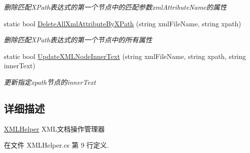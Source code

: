 \begin{DoxyCompactItemize}
\begin{DoxyCompactList}\small\item\em 删除匹配\-X\-Path表达式的第一个节点中的匹配参数xml\-Attribute\-Name的属性 \end{DoxyCompactList}\item 
static bool \hyperlink{class_x_c_l_net_tools_1_1_x_m_l_1_1_x_m_l_helper_a07059a8c89a84c359cc9893c842a263e}{Delete\-All\-Xml\-Attribute\-By\-X\-Path} (string xml\-File\-Name, string xpath)
\begin{DoxyCompactList}\small\item\em 删除匹配\-X\-Path表达式的第一个节点中的所有属性 \end{DoxyCompactList}\item 
static bool \hyperlink{class_x_c_l_net_tools_1_1_x_m_l_1_1_x_m_l_helper_a680dbf5fec70c3e5e30d0f75fedc2d3c}{Update\-X\-M\-L\-Node\-Inner\-Text} (string xml\-File\-Name, string xpath, string inner\-Text)
\begin{DoxyCompactList}\small\item\em 更新指定xpath节点的inner\-Text \end{DoxyCompactList}\end{DoxyCompactItemize}


\subsection{详细描述}
\hyperlink{class_x_c_l_net_tools_1_1_x_m_l_1_1_x_m_l_helper}{X\-M\-L\-Helper} X\-M\-L文档操作管理器 



在文件 X\-M\-L\-Helper.\-cs 第 9 行定义.



